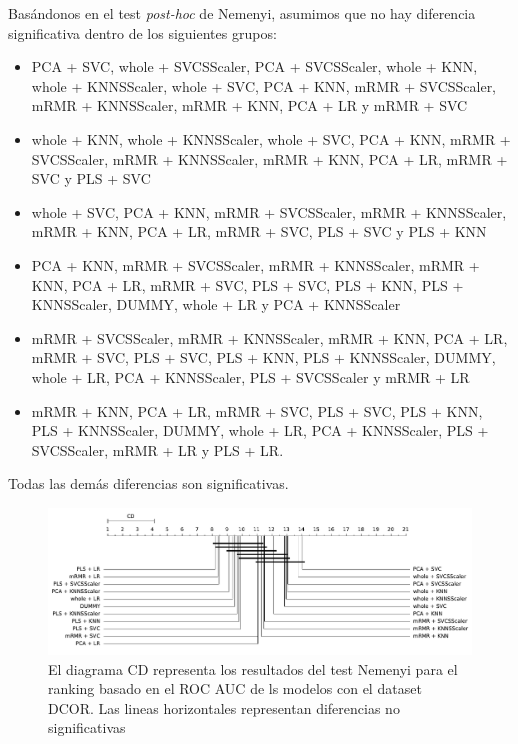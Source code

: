 \documentclass[a4paper,oneside,11pt,leqno]{article}
\begin{document}
	Basándonos en el test \textit{post-hoc} de Nemenyi, asumimos que no hay diferencia significativa dentro de los siguientes grupos:

	\begin{itemize}
		\item PCA + SVC, whole + SVCSScaler, PCA + SVCSScaler, whole + KNN, whole + KNNSScaler, whole + SVC, PCA + KNN, mRMR + SVCSScaler, mRMR + KNNSScaler, mRMR + KNN, PCA + LR y mRMR + SVC

		\item whole + KNN, whole + KNNSScaler, whole + SVC, PCA + KNN, mRMR + SVCSScaler, mRMR + KNNSScaler, mRMR + KNN, PCA + LR, mRMR + SVC y PLS + SVC

		\item whole + SVC, PCA + KNN, mRMR + SVCSScaler, mRMR + KNNSScaler, mRMR + KNN, PCA + LR, mRMR + SVC, PLS + SVC y PLS + KNN

		\item PCA + KNN, mRMR + SVCSScaler, mRMR + KNNSScaler, mRMR + KNN, PCA + LR, mRMR + SVC, PLS + SVC, PLS + KNN, PLS + KNNSScaler, DUMMY, whole + LR y PCA + KNNSScaler

		\item mRMR + SVCSScaler, mRMR + KNNSScaler, mRMR + KNN, PCA + LR, mRMR + SVC, PLS + SVC, PLS + KNN, PLS + KNNSScaler, DUMMY, whole + LR, PCA + KNNSScaler, PLS + SVCSScaler y mRMR + LR

		\item mRMR + KNN, PCA + LR, mRMR + SVC, PLS + SVC, PLS + KNN, PLS + KNNSScaler, DUMMY, whole + LR, PCA + KNNSScaler, PLS + SVCSScaler, mRMR + LR y PLS + LR.

	\end{itemize}

	Todas las demás diferencias son significativas.

	\begin{figure}[h]
		\includegraphics[width=\linewidth]{stat_results_dcor.pdf}
		\caption{El diagrama CD representa los resultados del test Nemenyi para el ranking basado en el ROC AUC de ls modelos con el dataset DCOR. Las lineas horizontales representan diferencias no significativas}
		\label{fig:stats_fig_dcor}
	\end{figure}
\end{document}
